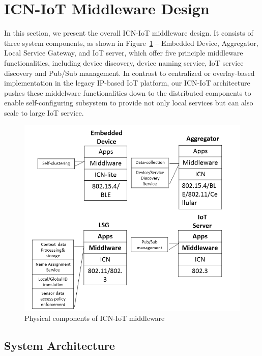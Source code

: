 \section{ICN-IoT Middleware Design}
In this section, we present the overall ICN-IoT middleware design. It consists of three system components, as shown in Figure~\ref{fig:phy} --  Embedded Device, Aggregator, Local Service Gateway, and IoT server, which offer five principle middleware functionalities, including device discovery, device naming service, IoT service discovery and Pub/Sub management.
In contrast to centralized or overlay-based implementation in the legacy IP-based IoT platform, our ICN-IoT architecture pushes these middelware functionalities down to the distributed components to enable self-configuring subsystem to provide not only local services but can also scale to large IoT service.
\begin{figure}
\includegraphics[width=\columnwidth]{figure/physical_comp.png}
\caption{\label{fig:phy}Physical components of ICN-IoT middleware}
\end{figure}

\subsection{System Architecture}\label{sec:physical}

